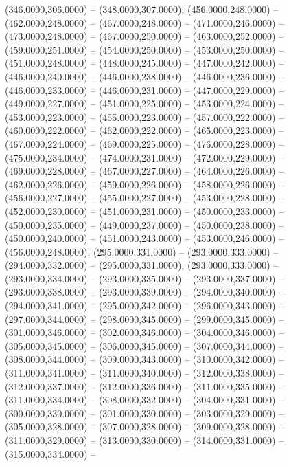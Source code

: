\begin{scope}[shift={(-231.87,-121.87)}]
\begin{scope}[draw=black,fill=cfdae61,line join=round,line width=0.208pt]
        (346.0000,306.0000) -- (348.0000,307.0000);
       (456.0000,248.0000) -- (462.0000,248.0000) --
        (467.0000,248.0000) -- (471.0000,246.0000) -- (473.0000,248.0000) --
        (467.0000,250.0000) -- (463.0000,252.0000) -- (459.0000,251.0000) --
        (454.0000,250.0000) -- (453.0000,250.0000) -- (451.0000,248.0000) --
        (448.0000,245.0000) -- (447.0000,242.0000) -- (446.0000,240.0000) --
        (446.0000,238.0000) -- (446.0000,236.0000) -- (446.0000,233.0000) --
        (446.0000,231.0000) -- (447.0000,229.0000) -- (449.0000,227.0000) --
        (451.0000,225.0000) -- (453.0000,224.0000) -- (453.0000,223.0000) --
        (455.0000,223.0000) -- (457.0000,222.0000) -- (460.0000,222.0000) --
        (462.0000,222.0000) -- (465.0000,223.0000) -- (467.0000,224.0000) --
        (469.0000,225.0000) -- (476.0000,228.0000) -- (475.0000,234.0000) --
        (474.0000,231.0000) -- (472.0000,229.0000) -- (469.0000,228.0000) --
        (467.0000,227.0000) -- (464.0000,226.0000) -- (462.0000,226.0000) --
        (459.0000,226.0000) -- (458.0000,226.0000) -- (456.0000,227.0000) --
        (455.0000,227.0000) -- (453.0000,228.0000) -- (452.0000,230.0000) --
        (451.0000,231.0000) -- (450.0000,233.0000) -- (450.0000,235.0000) --
        (449.0000,237.0000) -- (450.0000,238.0000) -- (450.0000,240.0000) --
        (451.0000,243.0000) -- (453.0000,246.0000) -- (456.0000,248.0000);
       (295.0000,331.0000) -- (293.0000,333.0000) --
        (294.0000,332.0000) -- (295.0000,331.0000);
       (293.0000,333.0000) -- (293.0000,334.0000) --
        (293.0000,335.0000) -- (293.0000,337.0000) -- (293.0000,338.0000) --
        (293.0000,339.0000) -- (294.0000,340.0000) -- (294.0000,341.0000) --
        (295.0000,342.0000) -- (296.0000,343.0000) -- (297.0000,344.0000) --
        (298.0000,345.0000) -- (299.0000,345.0000) -- (301.0000,346.0000) --
        (302.0000,346.0000) -- (304.0000,346.0000) -- (305.0000,345.0000) --
        (306.0000,345.0000) -- (307.0000,344.0000) -- (308.0000,344.0000) --
        (309.0000,343.0000) -- (310.0000,342.0000) -- (311.0000,341.0000) --
        (311.0000,340.0000) -- (312.0000,338.0000) -- (312.0000,337.0000) --
        (312.0000,336.0000) -- (311.0000,335.0000) -- (311.0000,334.0000) --
        (308.0000,332.0000) -- (304.0000,331.0000) -- (300.0000,330.0000) --
        (301.0000,330.0000) -- (303.0000,329.0000) -- (305.0000,328.0000) --
        (307.0000,328.0000) -- (309.0000,328.0000) -- (311.0000,329.0000) --
        (313.0000,330.0000) -- (314.0000,331.0000) -- (315.0000,334.0000) --

\end{scope}
\end{scope}
